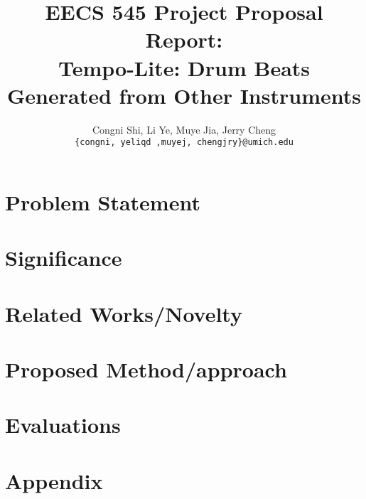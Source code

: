 \documentclass[11pt,letterpaper]{article}
\title{EECS 545 Project Proposal Report: \\
        Tempo-Lite: Drum Beats Generated from Other Instruments}
\author{Congni Shi, Li Ye, Muye Jia, Jerry Cheng\\
        \texttt{\{congni, yeliqd ,muyej, chengjry\}@umich.edu}
}
\begin{document}
\maketitle

\section{Problem Statement}
    \label{sec:problem}
    
\section{Significance}
    \label{sec:significance}
    
\section{Related Works/Novelty}
    \label{sec:novelty}
    
\section{Proposed Method/approach}
    \label{sec:approach}
    

\section{Evaluations}
    \label{sec:eval}
    

\section{Appendix}
    \label{sec:app}
    


\nocite{*}

\end{document}
